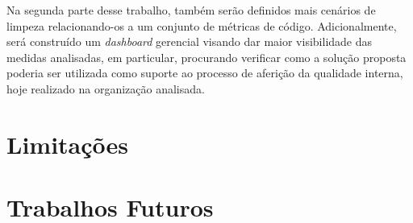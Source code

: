 Na segunda parte desse trabalho, também serão definidos mais cenários de limpeza relacionando-os a um conjunto de métricas de código. Adicionalmente, será construído um \textit{dashboard} gerencial visando dar maior visibilidade das medidas analisadas, em particular, procurando verificar como a solução proposta poderia ser utilizada como suporte ao processo de aferição da qualidade interna, hoje realizado na organização analisada.

\section{Limitações}


\section{Trabalhos Futuros}